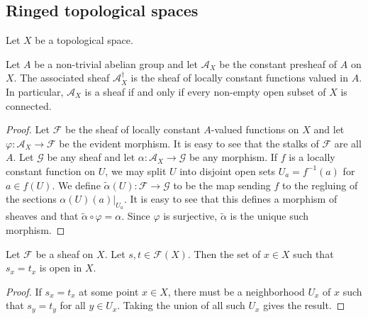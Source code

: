 \subsection{Ringed topological spaces}
	
Let $X$ be a topological space.

\begin{exer}
	Let $A$ be a non-trivial abelian group and let $\mathcal A_X$ be the
	constant presheaf of $A$ on $X$. The associated sheaf
	$\mathcal A_X^\dagger$ is the sheaf of locally constant functions valued
	in $A$. In particular, $\mathcal A_X$ is a sheaf if and only if every
	non-empty open subset of $X$ is connected.
\end{exer}
\begin{proof}
	Let $\mathcal F$ be the sheaf of locally constant $A$-valued functions
	on $X$ and let $\varphi: \mathcal A_X \to \mathcal F$ be the evident
	morphism. It is easy to see that the stalks of $\mathcal F$ are all $A$.
	Let $\mathcal G$ be any sheaf and let $\alpha: \mathcal A_X \to
	\mathcal G$ be any morphism. If $f$ is a locally constant function on
	$U$, we may split $U$ into disjoint open sets $U_a = f^{-1}(a)$ for
	$a \in f(U)$. We define $\widetilde{\alpha}(U) : \mathcal F \to
	\mathcal G$ to be the map sending $f$ to the regluing of the sections
	$\alpha(U)(a)|_{U_a}$. It is easy to see that this defines a morphism
	of sheaves and that $\widetilde{\alpha} \circ \varphi = \alpha$. Since
	$\varphi$ is surjective, $\widetilde{\alpha}$ is the unique such
	morphism.
\end{proof}

\begin{exer}
	Let $\mathcal F$ be a sheaf on $X$. Let $s,t \in \mathcal F(X)$. Then
	the set of $x \in X$ such that $s_x = t_x$ is open in $X$.
\end{exer}
\begin{proof}
	If $s_x = t_x$ at some point $x \in X$, there must be a neighborhood
	$U_x$ of $x$ such that $s_y = t_y$ for all $y \in U_x$. Taking the union
	of all such $U_x$ gives the result.
\end{proof}

